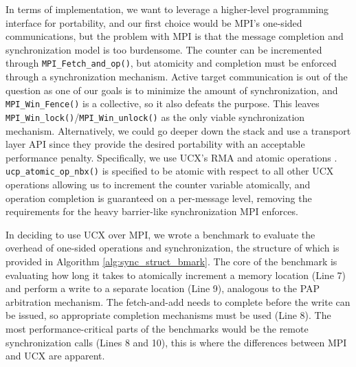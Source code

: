 



In terms of implementation, we want to leverage a higher-level programming interface for portability, and our first choice would be \gls{MPI}'s one-sided communications, but the problem with \gls{MPI} is that the message completion and synchronization model is too burdensome. 
The counter can be incremented through \texttt{MPI\_Fetch\_and\_op()}, but atomicity and completion must be enforced through a synchronization mechanism. 
Active target communication is out of the question as one of our goals is to minimize the amount of synchronization, and \texttt{MPI\_Win\_Fence()} is a collective, so it also defeats the purpose.
This leaves \texttt{MPI\_Win\_lock()}/\texttt{MPI\_Win\_unlock()} as the only viable synchronization mechanism.
Alternatively, we could go deeper down the stack and use a transport layer API since they provide the desired portability with an acceptable performance penalty.
Specifically, we use \gls{UCX}'s \gls{RMA} and atomic operations \cite{shamis2015ucx}.
\texttt{ucp\_atomic\_op\_nbx()} is specified to be atomic with respect to all other \gls{UCX} operations allowing us to increment the counter variable atomically, and operation completion is guaranteed on a per-message level, removing the requirements for the heavy barrier-like synchronization \gls{MPI} enforces.

In deciding to use \gls{UCX} over \gls{MPI}, we wrote a benchmark to evaluate the overhead of one-sided operations and synchronization, the structure of which is provided in Algorithm \ref{alg:sync_struct_bmark}.
The core of the benchmark is evaluating how long it takes to atomically increment a memory location (Line 7) and perform a write to a separate location (Line 9), analogous to the \gls{PAP} arbitration mechanism.
The fetch-and-add needs to complete before the write can be issued, so appropriate completion mechanisms must be used (Line 8).
The most performance-critical parts of the benchmarks would be the remote synchronization calls (Lines 8 and 10), this is where the differences between \gls{MPI} and \gls{UCX} are apparent.  


